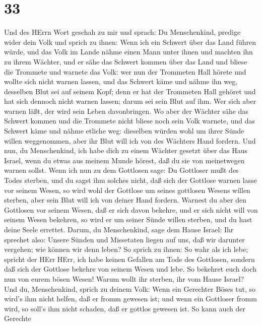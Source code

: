 \hypertarget{section-32}{%
\section{33}\label{section-32}}

 Und des HErrn Wort geschah zu mir und sprach: 
Du Menschenkind, predige wider dein Volk und sprich zu ihnen: Wenn ich
ein Schwert über das Land führen würde, und das Volk im Lande nähme
einen Mann unter ihnen und machten ihn zu ihrem Wächter, 
und er sähe das Schwert kommen über das Land und bliese die Trommete und
warnete das Volk:  wer nun der Trommeten Hall hörete und
wollte sich nicht warnen lassen, und das Schwert käme und nähme ihn weg,
desselben Blut sei auf seinem Kopf;  denn er hat der
Trommeten Hall gehöret und hat sich dennoch nicht warnen lassen; darum
sei sein Blut auf ihm. Wer sich aber warnen läßt, der wird sein Leben
davonbringen.  Wo aber der Wächter sähe das Schwert kommen
und die Trommete nicht bliese noch sein Volk warnete, und das Schwert
käme und nähme etliche weg: dieselben würden wohl um ihrer Sünde willen
weggenommen, aber ihr Blut will ich von des Wächters Hand fordern.
 Und nun, du Menschenkind, ich habe dich zu einem Wächter
gesetzt über das Haus Israel, wenn du etwas aus meinem Munde hörest, daß
du sie von meinetwegen warnen sollst.  Wenn ich nun zu dem
Gottlosen sage: Du Gottloser mußt des Todes sterben, und du sagst ihm
solches nicht, daß sich der Gottlose warnen lasse vor seinem Wesen, so
wird wohl der Gottlose um seines gottlosen Wesens willen sterben, aber
sein Blut will ich von deiner Hand fordern.  Warnest du aber
den Gottlosen vor seinem Wesen, daß er sich davon bekehre, und er sich
nicht will von seinem Wesen bekehren, so wird er um seiner Sünde willen
sterben, und du hast deine Seele errettet.  Darum, du
Menschenkind, sage dem Hause Israel: Ihr sprechet also: Unsere Sünden
und Missetaten liegen auf uns, daß wir darunter vergehen; wie können wir
denn leben?  So sprich zu ihnen: So wahr als ich lebe;
spricht der HErr HErr, ich habe keinen Gefallen am Tode des Gottlosen,
sondern daß sich der Gottlose bekehre von seinem Wesen und lebe. So
bekehret euch doch nun von eurem bösen Wesen! Warum wollt ihr sterben,
ihr vom Hause Israel?  Und du, Menschenkind, sprich zu
deinem Volk: Wenn ein Gerechter Böses tut, so wird's ihm nicht helfen,
daß er fromm gewesen ist; und wenn ein Gottloser fromm wird, so soll's
ihm nicht schaden, daß er gottlos gewesen ist. So kann auch der Gerechte
